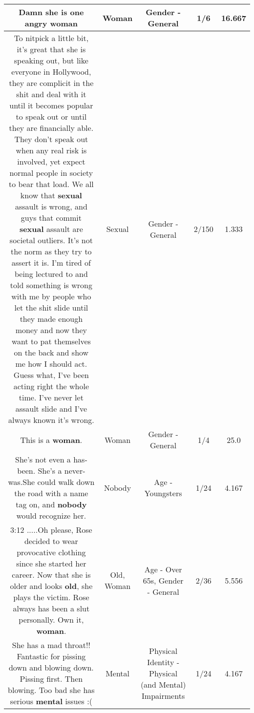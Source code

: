\documentclass[11pt]{article}
\newlength\mylength
\begin{document}
\begin{center}
\begin{longtable}{|C{.65\mylength}|C{.30\mylength}|C{.12\mylength}|C{.12\mylength}|C{.12\mylength}|}
  \small Damn she is one angry woman\normalsize   & Woman & Gender - General & 1/6 & 16.667 \\  \hline
  \small To nitpick a little bit, it's great that she is speaking out, but like everyone in Hollywood, they are complicit in the shit and deal with it until it becomes popular to speak out or until they are financially able. They don't speak out when any real risk is involved, yet expect normal people in society to bear that load. We all know that \textbf{sexual} assault is wrong, and guys that commit \textbf{sexual} assault are societal outliers. It's not the norm as they try to assert it is. I'm tired of being lectured to and told something is wrong with me by people who let the shit slide until they made enough money and now they want to pat themselves on the back and show me how I should act. Guess what, I've been acting right the whole time. I've never let assault slide and I've always known it's wrong.\normalsize   & Sexual & Gender - General & 2/150 & 1.333 \\  \hline
  \small This is a \textbf{woman}.\normalsize   & Woman & Gender - General & 1/4 & 25.0 \\  \hline
  \small She's not even a has-been.   She's a never-was.She could walk down the road with a name tag on, and \textbf{nobody} would recognize her.\normalsize   & Nobody & Age - Youngsters & 1/24 & 4.167 \\  \hline
  \small 3:12 .....Oh please, Rose decided to wear provocative clothing since she started her career. Now that she is older and looks \textbf{old}, she plays the victim. Rose always has been a slut personally. Own it, \textbf{woman}.\normalsize   & Old, Woman & Age - Over 65s, Gender - General & 2/36 & 5.556 \\  \hline
  \small She has a mad throat!! Fantastic for pissing down and blowing down. Pissing first. Then blowing. Too bad she has serious \textbf{mental} issues :(\normalsize   & Mental & Physical Identity - Physical (and Mental) Impairments & 1/24 & 4.167 \\  \hline

\end{longtable}
\end{center}
\end{document}
